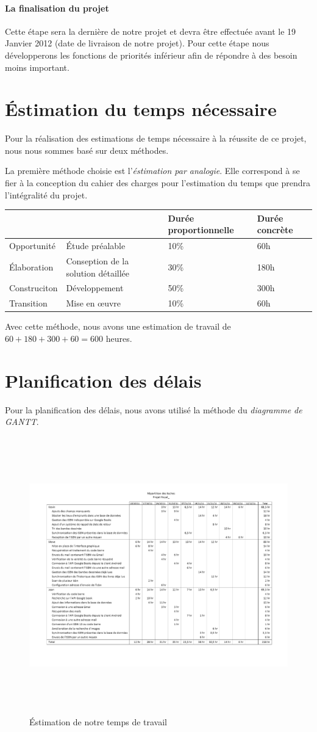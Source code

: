 \paragraph{La finalisation du projet}

Cette étape sera la dernière de notre projet et devra être effectuée avant le 19 Janvier 2012 (date de livraison de notre projet).
Pour cette étape nous développerons les fonctions de priorités inférieur afin de répondre à des besoin moins important. 

\section{Éstimation du temps nécessaire}
Pour la réalisation des estimations de temps nécessaire à la réussite de ce projet,
nous nous sommes basé sur deux méthodes. 

La première méthode choisie est l'\emph{éstimation par analogie}.
Elle correspond à se fier à la conception du cahier des charges pour l'estimation du temps que prendra l'intégralité du projet. 

\begin{tabular}{|l l|l|l|}
\hline
&& Durée proportionnelle & Durée concrète \\
\hline
Opportunité & Étude préalable & 10\% & 60h \\
\hline
Élaboration & Conseption de la solution détaillée & 30\% & 180h \\
\hline
Construciton & Développement & 50\% & 300h \\
\hline
Transition & Mise en œuvre & 10\% & 60h \\
\hline
\end{tabular}

Avec cette méthode, nous avons une estimation de travail de $60 + 180 + 300 + 60 = 600$ heures. 

\section{Planification des délais}

Pour la planification des délais, nous avons utilisé la méthode du \emph{diagramme de GANTT}.
\begin{figure}[h]
\begin{center}
\includegraphics[height=12cm]{../repartition_des_taches.png}
\end{center}
\caption{Éstimation de notre temps de travail}
\end{figure}
